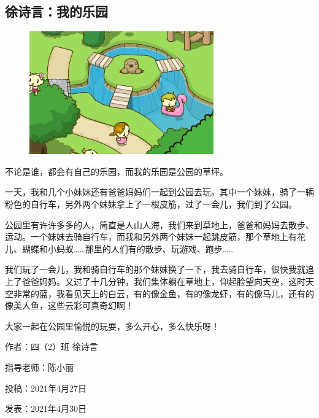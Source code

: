 \vspace{10pt}

{\centering\subsection*{徐诗言：我的乐园}}


\renewcommand{\leftmark}{徐诗言：我的乐园}

\begin{figure}[htbp]

\centering

\includegraphics[width = .5\textwidth]{./ch/32.jpg}

\end{figure}



不论是谁，都会有自己的乐园，而我的乐园是公园的草坪。



一天，我和几个小妹妹还有爸爸妈妈们一起到公园去玩。其中一个妹妹，骑了一辆粉色的自行车，另外两个妹妹拿上了一根皮筋，过了一会儿，我们到了公园。



公园里有许许多多的人，简直是人山人海，我们来到草地上，爸爸和妈妈去散步、运动。一个妹妹去骑自行车，而我和另外两个妹妹一起跳皮筋，那个草地上有花儿、蝴蝶和小蚂蚁……那里的人们有的散步、玩游戏、跑步……



我们玩了一会儿，我和骑自行车的那个妹妹换了一下，我去骑自行车，很快我就追上了爸爸妈妈。又过了十几分钟，我们集体躺在草地上，仰起脸望向天空，这时天空非常的蓝，我看见天上的白云，有的像金鱼，有的像龙虾，有的像马儿，还有的像美人鱼，这些云彩可真奇幻啊！



大家一起在公园里愉悦的玩耍，多么开心，多么快乐呀！





\vspace{10pt}



作者：四（2）班 徐诗言



指导老师：陈小丽



投稿：2021年4月27日





发表：2021年4月30日






                



\vspace{10pt}

\hline



